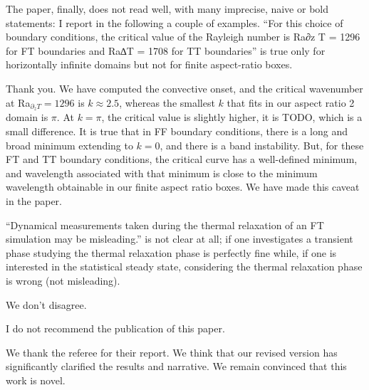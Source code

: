 \documentclass[aps, 11pt, singlecolumn]{revtex4-1} %
\begin{document}
\begin{singlespace}
\begin{myquotation}
The paper, finally, does not read well, with many imprecise, naive or bold statements: I report in the following a couple of examples. 
``For this choice of boundary conditions, the critical value of the Rayleigh number is Ra∂z T = 1296 for FT boundaries and Ra∆T = 1708 for TT boundaries'' is true only for horizontally infinite domains but not for finite aspect-ratio boxes.
\end{myquotation}
Thank you.
We have computed the convective onset, and the critical wavenumber at Ra$_{\partial_z T} = 1296$ is $k \approx 2.5$, whereas the smallest $k$ that fits in our aspect ratio 2 domain is $\pi$.
At $k = \pi$, the critical value is slightly higher, it is TODO, which is a small difference.
It is true that in FF boundary conditions, there is a long and broad minimum extending to $k = 0$, and there is a band instability.
But, for these FT and TT boundary conditions, the critical curve has a well-defined minimum, and wavelength associated with that minimum is close to the minimum wavelength obtainable in our finite aspect ratio boxes.
We have made this caveat in the paper.

\begin{myquotation}
``Dynamical measurements taken during the thermal relaxation of an FT simulation may be misleading.'' is not clear at all; if one investigates a transient phase studying the thermal relaxation phase is perfectly fine while, if one is interested in the statistical steady state, considering the thermal relaxation phase is wrong (not misleading). 
\end{myquotation}
We don't disagree.

\begin{myquotation}
I do not recommend the publication of this paper.
\end{myquotation}
We thank the referee for their report.
We think that our revised version has significantly clarified the results and narrative.
We remain convinced that this work is novel.


\end{singlespace}





\end{document}

